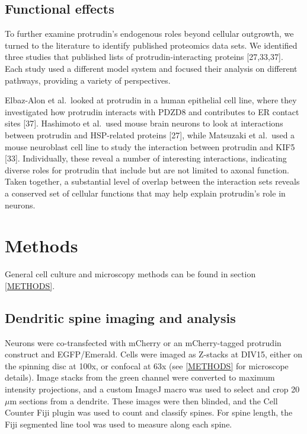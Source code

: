 \documentclass[
  12pt,
  a4paper,
]{book}
\begin{document}
\hypertarget{functional-effects}{%
\subsection{Functional effects}\label{functional-effects}}

To further examine protrudin's endogenous roles beyond cellular outgrowth, we turned to the literature to identify published proteomics data sets. We identified three studies that published lists of protrudin-interacting proteins {[}27,33,37{]}. Each study used a different model system and focused their analysis on different pathways, providing a variety of perspectives.

Elbaz-Alon et al.~looked at protrudin in a human epithelial cell line, where they investigated how protrudin interacts with PDZD8 and contributes to ER contact sites {[}37{]}. Hashimoto et al.~used mouse brain neurons to look at interactions between protrudin and HSP-related proteins {[}27{]}, while Matsuzaki et al.~used a mouse neuroblast cell line to study the interaction between protrudin and KIF5 {[}33{]}. Individually, these reveal a number of interesting interactions, indicating diverse roles for protrudin that include but are not limited to axonal function. Taken together, a substantial level of overlap between the interaction sets reveals a conserved set of cellular functions that may help explain protrudin's role in neurons.

\hypertarget{methods-1}{%
\section{Methods}\label{methods-1}}

General cell culture and microscopy methods can be found in section \ref{METHODS}.

\hypertarget{dendritic-spine-imaging-and-analysis}{%
\subsection{Dendritic spine imaging and analysis}\label{dendritic-spine-imaging-and-analysis}}

Neurons were co-transfected with mCherry or an mCherry-tagged protrudin construct and EGFP/Emerald. Cells were imaged as Z-stacks at DIV15, either on the spinning disc at 100x, or confocal at 63x (see \ref{METHODS} for microscope details). Image stacks from the green channel were converted to maximum intensity projections, and a custom ImageJ macro was used to select and crop 20\(\mu\)m sections from a dendrite. These images were then blinded, and the Cell Counter Fiji plugin was used to count and classify spines. For spine length, the Fiji segmented line tool was used to measure along each spine.
\end{document}
